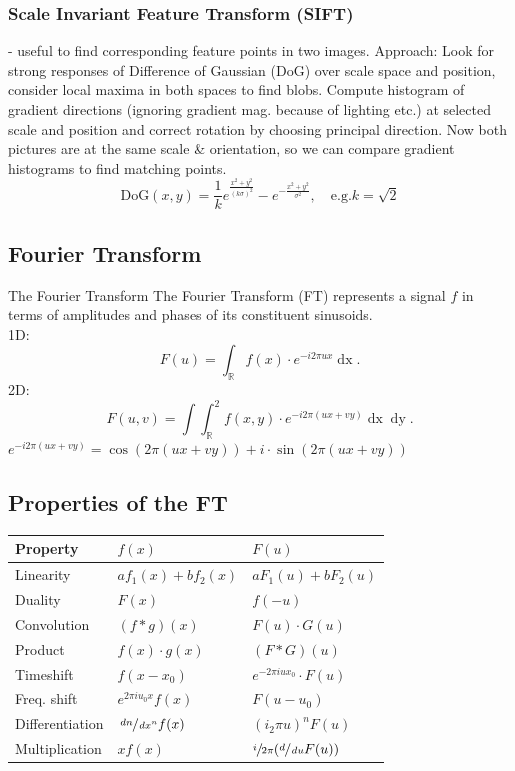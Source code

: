 \documentclass[a4paper,10pt]{article}
\begin{document}
\subsubsection{Scale Invariant Feature Transform (SIFT)} - useful to find corresponding feature points in two images. Approach: Look for strong responses of Difference of Gaussian (DoG) over scale space and position, consider local maxima in both spaces to find blobs. Compute histogram of gradient directions (ignoring gradient mag. because of lighting etc.) at selected scale and position and correct rotation by choosing principal direction. Now both pictures are at the same scale \& orientation, so we can compare gradient histograms to find matching points. \[
	\text{DoG}(x,y) = \frac{1}{k} e^{\frac{x^2+y^2}{(k\sigma)^2}} - e^{-\frac{x^2+y^2}{\sigma ^2}}, \quad \text{e.g.} k=\sqrt{2} 
\] 

\subsection{Fourier Transform}

\begin{mainbox}{The Fourier Transform}	
    The Fourier Transform (FT) represents a signal \( f \) in terms of amplitudes and phases of its constituent sinusoids.\\
    1D: \[
	F(u) = \int_\mathbb{R} f(x) \cdot e^{-i2\pi ux} \mathop{dx}
    .\] 
    2D: \[
	F(u,v) = \int \int_\mathbb{R}^2 f(x,y) \cdot e^{-i2\pi(ux + vy)} \mathop{dx} \mathop{dy}
    .\] 
    \( e^{-i2\pi (ux+vy)} = \cos (2\pi (ux+vy)) + i \cdot \sin(2\pi (ux + vy)) \)
\end{mainbox}

\subsection{Properties of the FT}
\begin{center}
    \begin{tabularx}{\linewidth}{lll}
	\toprule
	Property & \( f(x) \) & \( F(u) \) \\
	\midrule
	Linearity & \( af_{1}(x) + bf_{2}(x) \) & \( aF_{1}(u) + bF_{2}(u) \) \\
	Duality & \( F(x) \) & \( f(-u) \) \\
	Convolution & \( (f*g)(x) \) & \( F(u) \cdot G(u) \) \\
	Product & \( f(x) \cdot g(x) \) & \( (F*G)(u) \) \\
	Timeshift & \( f(x -x_{0}) \) & \( e^{-2\pi i ux_{0}} \cdot F(u) \) \\
	Freq. shift & \( e^{2\pi i u_{0}x} f(x) \) & \( F(u - u_{0}) \) \\
	Differentiation & \( \sfrac{\mathop{dn}}{\mathop{dx^n}} f(x) \) & \( (i_{2}\pi u)^n F(u) \) \\
	Multiplication & \( xf(x) \) & \( \sfrac{i}{2\pi } (\sfrac{d}{\mathop{du}} F(u)) \) \\
	\bottomrule
    \end{tabularx}
\end{center}
\end{document}
